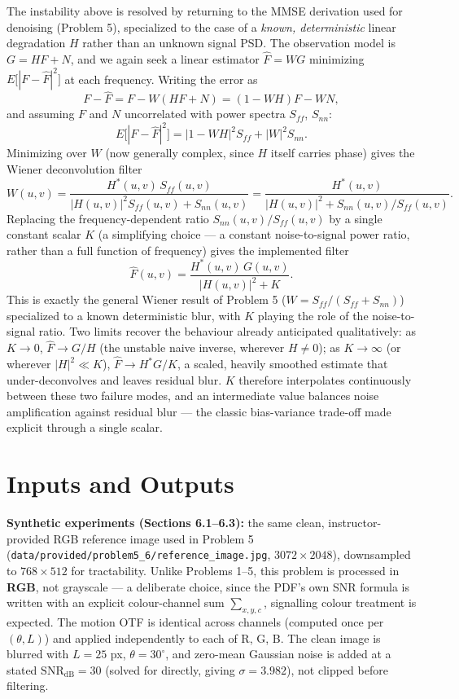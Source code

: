\documentclass[11pt]{article}
\begin{document}
The instability above is resolved by returning to the MMSE derivation used for denoising
(Problem 5), specialized to the case of a \emph{known, deterministic} linear degradation $H$
rather than an unknown signal PSD. The observation model is $G=HF+N$, and we again seek a
linear estimator $\hat F = W G$ minimizing $E\big[|F-\hat F|^2\big]$ at each frequency. Writing
the error as
\[
F - \hat F = F - W(HF+N) = (1-WH)F - WN,
\]
and assuming $F$ and $N$ uncorrelated with power spectra $S_{ff}$, $S_{nn}$:
\[
E\big[|F-\hat F|^2\big] = |1-WH|^2 S_{ff} + |W|^2 S_{nn}.
\]
Minimizing over $W$ (now generally complex, since $H$ itself carries phase) gives the Wiener
deconvolution filter
\[
W(u,v) = \frac{H^*(u,v)\,S_{ff}(u,v)}{|H(u,v)|^2 S_{ff}(u,v) + S_{nn}(u,v)}
       = \frac{H^*(u,v)}{|H(u,v)|^2 + S_{nn}(u,v)/S_{ff}(u,v)}.
\]
Replacing the frequency-dependent ratio $S_{nn}(u,v)/S_{ff}(u,v)$ by a single constant scalar
$K$ (a simplifying choice — a constant noise-to-signal power ratio, rather than a full function
of frequency) gives the implemented filter
\[
\boxed{\hat F(u,v) = \frac{H^*(u,v)\,G(u,v)}{|H(u,v)|^2 + K}.}
\]
This is exactly the general Wiener result of Problem 5 ($W=S_{ff}/(S_{ff}+S_{nn})$) specialized
to a known deterministic blur, with $K$ playing the role of the noise-to-signal ratio. Two
limits recover the behaviour already anticipated qualitatively: as $K\to0$, $\hat F \to G/H$
(the unstable naive inverse, wherever $H\ne0$); as $K\to\infty$ (or wherever $|H|^2\ll K$),
$\hat F \to H^*G/K$, a scaled, heavily smoothed estimate that under-deconvolves and leaves
residual blur. $K$ therefore interpolates continuously between these two failure modes, and an
intermediate value balances noise amplification against residual blur — the classic
bias-variance trade-off made explicit through a single scalar.

\section{Inputs and Outputs}

\textbf{Synthetic experiments (Sections 6.1--6.3):} the same clean, instructor-provided RGB
reference image used in Problem 5 (\texttt{data/provided/problem5\_6/reference\_image.jpg},
$3072\times2048$), downsampled to $768\times512$ for tractability. Unlike Problems 1--5, this
problem is processed in \textbf{RGB}, not grayscale — a deliberate choice, since the PDF's own
SNR formula is written with an explicit colour-channel sum $\sum_{x,y,c}$, signalling colour
treatment is expected. The motion OTF is identical across channels (computed once per
$(\theta,L)$) and applied independently to each of R, G, B. The clean image is blurred with
$L=25$ px, $\theta=30^\circ$, and zero-mean Gaussian noise is added at a stated
$\mathrm{SNR}_{\mathrm{dB}}=30$ (solved for directly, giving $\sigma=3.982$), not clipped before
filtering.
\end{document}
